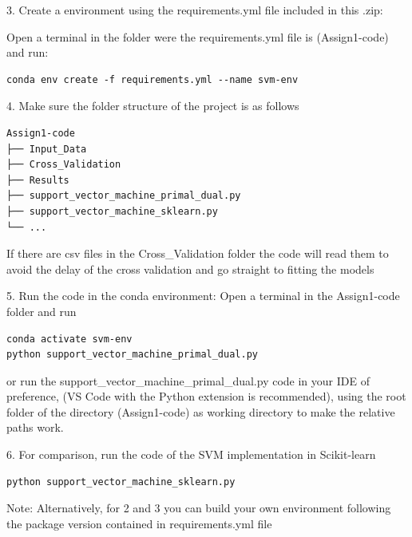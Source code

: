 \documentclass[11pt,twocolumn,letterpaper]{article}
\begin{document}
3. Create a environment using the requirements.yml file included in this .zip:

Open a terminal in the folder were the requirements.yml file is (Assign1-code) and run:

\begin{verbatim}
conda env create -f requirements.yml --name svm-env
\end{verbatim}

4. Make sure the folder structure of the project is as follows

\begin{verbatim}
Assign1-code
├── Input_Data
├── Cross_Validation
├── Results
├── support_vector_machine_primal_dual.py
├── support_vector_machine_sklearn.py
└── ...
\end{verbatim}

If there are csv files in the Cross\_Validation folder the code will read them to avoid the delay of the cross validation and go straight to fitting the models

5.  Run the code in the conda environment: Open a terminal in the Assign1-code folder  and run 
\begin{verbatim}
conda activate svm-env
python support_vector_machine_primal_dual.py
\end{verbatim}

or run the support\_vector\_machine\_primal\_dual.py code in your IDE of preference, (VS Code with the Python extension is recommended), using the root folder of the directory (Assign1-code) as working directory to make the relative paths work.

6. For comparison, run the code of the SVM implementation in Scikit-learn
\begin{verbatim}
python support_vector_machine_sklearn.py
\end{verbatim}
Note: Alternatively, for 2 and 3 you can build your own environment following the package version contained in requirements.yml file
\end{document}
